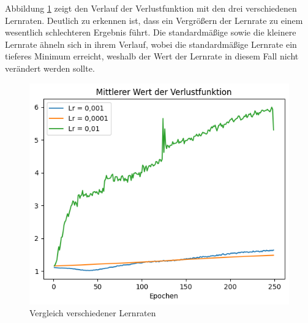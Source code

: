 Abbildung \ref*{fig:LossLR} zeigt den Verlauf der Verlustfunktion mit den drei verschiedenen Lernraten. Deutlich zu erkennen ist, dass ein Vergrößern der Lernrate zu 
einem wesentlich schlechteren Ergebnis führt. Die standardmäßige sowie die kleinere Lernrate ähneln sich in ihrem Verlauf, wobei die standardmäßige Lernrate
ein tieferes Minimum erreicht, weshalb der Wert der Lernrate in diesem Fall nicht verändert werden sollte.

\begin{figure}[H]
    \centering
    \includegraphics[width=.75\textwidth]{abbildungen/Optimierer/LossLR.png}
    \caption{Vergleich verschiedener Lernraten}
    \label{fig:LossLR}
\end{figure}

